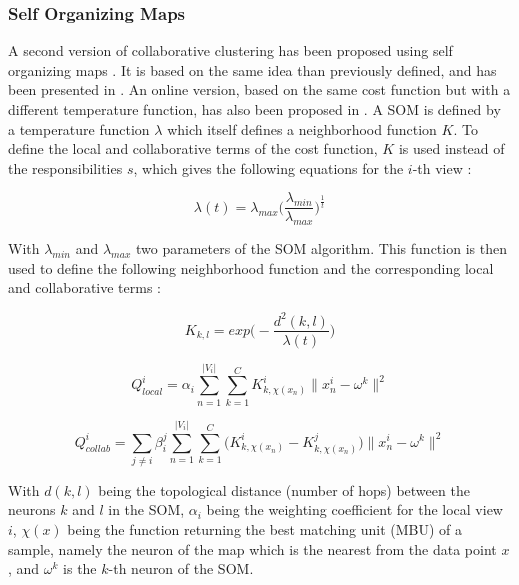 \documentclass[a4paper]{report}
\begin{document}
    \subsubsection{Self Organizing Maps}

    A second version of collaborative clustering has been proposed using self organizing maps \cite{kohonen1998self}. It is based on the same idea than previously defined, and has been presented in \cite{grozavu2010topological}. An online version, based on the same cost function but with a different temperature function, has also been proposed in \cite{maurel2017incremental}. A SOM is defined by a temperature function $\lambda$ which itself defines a neighborhood function $K$. To define the local and collaborative terms of the cost function, $K$ is used instead of the responsibilities $s$, which gives the following equations for the $i$-th view :

    \begin{equation}
        \lambda(t) = \lambda_{max}\Big(\frac{\lambda_{min}}{\lambda_{max}}\Big)^{\frac{1}{t}}
        \label{eq:som_temp}
    \end{equation}

    With $\lambda_{min}$ and $\lambda_{max}$ two parameters of the SOM algorithm. This function is then used to define the following neighborhood function and the corresponding local and collaborative terms :

    \begin{equation}
        K_{k,l} = exp\Big(-\frac{d^2(k,l)}{\lambda(t)}\Big)
        \label{eq:som_neigh}
    \end{equation}

    \begin{equation}
        Q_{local}^i = \alpha_i \sum_{n=1}^{|V_i|}\sum_{k=1}^C K^i_{k,\chi(x_n)}\|x_n^i - \omega^k \|^2 
        \label{eq:som_cc_local}
    \end{equation}

    \begin{equation}
    Q_{collab}^i = \sum_{j \neq i}\beta_i^j \sum_{n=1}^{|V_i|}\sum_{k=1}^C \big(K^i_{k,\chi(x_n)} - K^j_{k,\chi(x_n)}\big)\|x_n^i - \omega^k \|^2 
        \label{eq:som_cc_collab}
    \end{equation}

    With $d(k,l)$ being the topological distance (number of hops) between the neurons $k$ and $l$ in the SOM, $\alpha_i$ being the weighting coefficient for the local view $i$, $\chi(x)$ being the function returning the best matching unit (MBU) of a sample, namely the neuron of the map which is the nearest from the data point $x$, and $\omega^k$ is the $k$-th neuron of the SOM.
\end{document}
